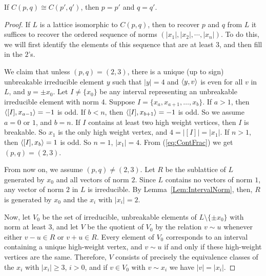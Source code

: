 \begin{prop}\label{pp}
If $C(p, q) \cong C(p', q')$, then $p = p'$ and $q = q'$. 
\end{prop}
\begin{proof}
If $L$ is a lattice isomorphic to $C(p,q)$, then to recover $p$ and $q$ from $L$ it suffices to recover the ordered sequence of norms $(|x_1|,|x_2|,\cdots,|x_n|)$. To do this, we will first identify the elements of this sequence that are at least $3$, and then fill in the $2$'s. 

We claim that unless $(p,q)=(2,3)$, there is a unique (up to sign) unbreakable irreducible element $y$ such that $|y|=4$ and $\left\langle y , v \right\rangle$ is even for all $v$ in $L$, and $y=\pm x_0$. Let $I\ne\{x_0\}$ be any interval representing an unbreakable irreducible element with norm 4. Suppose $I=\{x_a,x_{a+1},\dots,x_b\}$.
If $a>1$, then $\left\langle [I] , x_{a-1} \right\rangle=-1$ is odd. If $b<n$, then $\left\langle [I] , x_{b+1} \right\rangle=-1$ is odd. So we assume $a=0$ or $1$, and $b=n$. If $I$ contains at least two high weight vertices, then $I$ is breakable. So $x_1$ is the only high weight vertex, and $4=|[I]|=|x_1|$. If $n>1$, then $\left\langle [I] , x_{b} \right\rangle=1$ is odd. So $n=1$, $|x_1|=4$. From (\ref{eq:ContFrac}) we get $(p,q)=(2,3)$.

From now on, we assume $(p,q)\ne(2,3)$.
 Let $R$ be the sublattice of $L$ generated by $x_0$ and all vectors of norm $2$. 
Since $L$ contains no vectors of norm $1$, any vector of norm $2$ in $L$ is irreducible. By Lemma~\ref{Lem:IntervalNorm}, then, $R$ is generated by $x_0$ and the $x_i$ with $|x_i| = 2$.

Now, let $V_0$ be the set of irreducible, unbreakable elements of $L\setminus\{\pm x_0\}$ with norm at least $3$, and let $V$ be the quotient of $V_0$ by the relation $v \sim u$ whenever either $v-u \in R$ or $v+u \in R$. Every element of $V_0$ corresponds to an interval containing a unique high-weight vertex, and $v \sim u$ if and only if these high-weight vertices are the same. Therefore, $V$ consists of precisely the equivalence classes of the $x_i$ with $|x_i| \ge 3$, $i>0$, and if $v \in V_0$ with $v \sim x_i$ we have $|v| = |x_i|$.


\end{proof}
